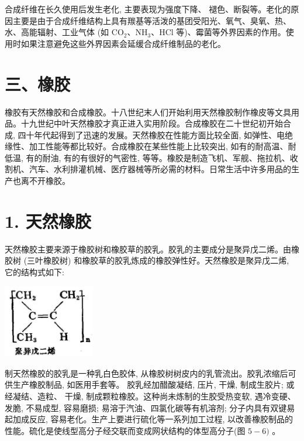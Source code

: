 \documentclass[10pt]{article}
\begin{document}
合成纤维在长久使用后发生老化, 主要表现为强度下降、 褪色、断裂等。老化的原因主要是由于合成纤维结构上具有羰基等活泼的基团受阳光、氧气、臭氧、热、水、高能辐射、工业气体 (如 \({\mathrm{{CO}}}_{2}\text{、}{\mathrm{{NH}}}_{3}\text{、}\mathrm{{HCl}}\) 等)、霉菌等外界因素的作用。使用时如果注意避免这些外界因素会延缓合成纤维制品的老化。

\section*{三、橡胶}

橡胶有天然橡胶和合成橡胶。十八世纪末人们开始利用天然橡胶制作橡皮等文具用品。十九世纪中叶天然橡胶才真正进入实用阶段。合成橡胶在二十世纪初开始合成, 四十年代起得到了迅速的发展。天然橡胶在性能方面比较全面, 如弹性、电绝缘性、加工性能等都比较好。合成橡胶在某些性能上比较突出, 如有的耐高温、耐低温, 有的耐油, 有的有很好的气密性, 等等。橡胶是制造飞机、军舰、拖拉机、收割机、汽车、水利排灌机械、医疗器械等所必需的材料。日常生活中许多用品的生产也离不开橡胶。

\section*{1. 天然橡胶}

天然橡胶主要来源于橡胶树和橡胶草的胶乳。胶乳的主要成分是聚异戊二烯。由橡胶树 (三叶橡胶树) 和橡胶草的胶乳炼成的橡胶弹性好。天然橡胶是聚异戊二烯, 它的结构式如下:

\begin{center}
\includegraphics[max width=0.3\textwidth]{images/01912d16-be99-77bb-9535-4f3ed8d9946f_197_647930.jpg}
\end{center}

制天然橡胶的胶乳是一种乳白色胶体, 从橡胶树树皮内的乳管流出。胶乳浓缩后可供生产橡胶制品, 如医用手套等。 胶乳经加醋酸凝结, 压片, 干燥, 制成生胶片; 或经凝结、造粒、 干燥, 制成颗粒橡胶。这种尚未炼制的生胶受热变软, 遇冷变硬、发脆, 不易成型, 容易磨损; 易溶于汽油、四氯化碳等有机溶剂; 分子内具有双键易起加成反应, 容易老化。生产上要进行硫化等一系列加工过程, 以改善橡胶制品的性能。硫化是使线型高分子经交联而变成网状结构的体型高分子(图 \(5 - 6)\) 。
\end{document}
